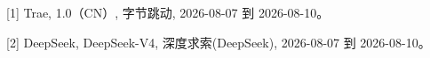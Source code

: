 
[1] Trae, 1.0（CN）, 字节跳动, 2026-08-07 到 2026-08-10。

[2] DeepSeek, DeepSeek-V4, 深度求索(DeepSeek), 2026-08-07 到 2026-08-10。
